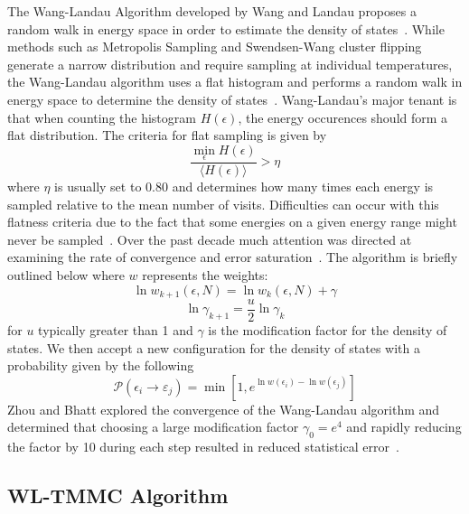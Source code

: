 \documentclass[letterpaper,twocolumn,amsmath,amssymb,pre,aps,10pt]{revtex4-1}
\begin{document}
The Wang-Landau Algorithm developed by Wang and Landau proposes a random walk in energy space in order to estimate the density of states~\cite{wang2001efficient}. While methods such as Metropolis Sampling and Swendsen-Wang cluster flipping~\cite{swendsen1987nonuniversal} generate a narrow distribution and require sampling at individual temperatures, the Wang-Landau algorithm uses a flat histogram and performs a random walk in energy space to determine the density of states~\cite{wang2001determining, landau2014guide}. Wang-Landau's major tenant is that when counting the histogram
$H(\epsilon)$, the energy occurences should form a flat distribution.  The criteria for flat sampling is given by
\begin{equation}
	\frac{\min_{\epsilon} H(\epsilon)}
	{\big\langle H(\epsilon)\big\rangle }
	> \eta
\end{equation}
where $\eta$ is usually set to $0.80$ and determines how many times each energy is sampled relative to the mean number of visits.  Difficulties can occur with this flatness criteria due to the fact that some energies on a given energy range might never be sampled~\cite{haber2014transition}.  Over the past decade much attention was directed at examining the rate of convergence and error saturation~\cite{lee2006convergence, belardinelli2007wang}.  The algorithm is briefly outlined below where $w$ represents the weights:
\begin{equation}
	\ln{w_{k+1}(\epsilon,N)}=\ln{w_{k}(\epsilon,N)}
	+\gamma
\end{equation}
\begin{equation}
	\ln{\gamma_{k+1}}=\frac{u}{2}\ln{\gamma_{k}}
\end{equation}
for $u$ typically greater than 1 and $\gamma$ is the modification factor for
the density of states.  We then accept a new configuration for the density of
states with a probability given by the following
\begin{equation}
	\mathcal{P}(\epsilon_i \rightarrow \varepsilon_j)
	= \min[1,e^{\ln{w(\epsilon_i)}-\ln{w(\epsilon_j)}}]
\end{equation}
Zhou and Bhatt explored the convergence of the Wang-Landau algorithm and
determined that choosing a large modification factor $\gamma_0 = e^{4}$ and
rapidly reducing the factor by 10 during each step resulted in reduced statistical
error~\cite{zhou2005understanding}.


\subsection{WL-TMMC Algorithm}
\end{document}
